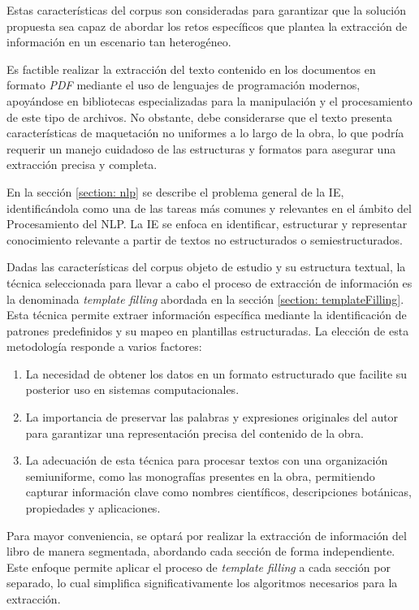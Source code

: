 Estas características del corpus son consideradas para garantizar que la solución propuesta sea capaz de 
abordar los retos específicos que plantea la extracción de información en un escenario tan heterogéneo.

Es factible realizar la extracción del texto contenido en los documentos en formato \textit{PDF} mediante el uso 
de lenguajes de programación modernos, apoyándose en bibliotecas especializadas para la manipulación y 
el procesamiento de este tipo de archivos. No obstante, debe considerarse que el texto presenta 
características de maquetación no uniformes a lo largo de la obra, lo que podría requerir un manejo 
cuidadoso de las estructuras y formatos para asegurar una extracción precisa y completa.

En la sección \ref{section: nlp} se describe el problema general de la IE, identificándola como una 
de las tareas más comunes y relevantes en el ámbito del Procesamiento del NLP. La IE
se enfoca en identificar, estructurar y representar conocimiento relevante a partir de 
textos no estructurados o semiestructurados.

Dadas las características del corpus objeto de estudio y su estructura textual, la técnica seleccionada 
para llevar a cabo el proceso de extracción de información es la denominada \textit{template filling} abordada en la sección \ref{section: templateFilling}. 
Esta técnica permite extraer información específica mediante la identificación de patrones 
predefinidos y su mapeo en plantillas estructuradas. La elección de esta metodología 
responde a varios factores:
\begin{enumerate}
    \item La necesidad de obtener los datos en un formato estructurado que facilite su posterior uso
    en sistemas computacionales.
    \item La importancia de preservar las palabras y expresiones originales del autor 
    para garantizar una representación precisa del contenido de la obra.
    \item La adecuación de esta técnica para procesar textos con una organización semiuniforme, 
    como las monografías presentes en la obra, permitiendo capturar información clave como 
    nombres científicos, descripciones botánicas, propiedades y aplicaciones.
\end{enumerate}

Para mayor conveniencia, se optará por realizar la extracción de información del libro de manera segmentada, 
abordando cada sección de forma independiente. Este enfoque permite aplicar el proceso de \textit{template filling} 
a cada sección por separado, lo cual simplifica significativamente los algoritmos necesarios para la extracción.



